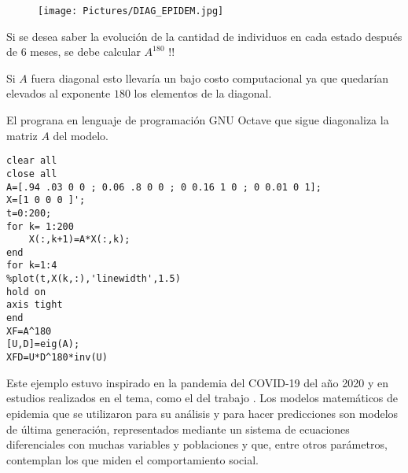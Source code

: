 \bigskip



\begin{figure}[ht]
	\centering
			\texttt{[image: Pictures/DIAG\_EPIDEM.jpg]}
 \end{figure}

\bigskip

Si se desea saber la evolución de la cantidad de individuos en cada estado después de 6 meses, se debe calcular $A^{180}$ !! 

Si $A$ fuera diagonal esto llevaría un  bajo costo computacional ya que quedarían elevados al exponente $180$  los elementos de la diagonal.



\bigskip

El prograna en lenguaje de programación GNU Octave que sigue diagonaliza la matriz $A$ del modelo. 


\bigskip



\begin{lstlisting}[frame=single]
% MODELO SIRD (SUSCEPTIBLES, INFECTADOS, RECUPERADOS, FALLECIDOS)
clear all
close all
A=[.94 .03 0 0 ; 0.06 .8 0 0 ; 0 0.16 1 0 ; 0 0.01 0 1];
X=[1 0 0 0 ]';
t=0:200;
for k= 1:200
    X(:,k+1)=A*X(:,k);
end
for k=1:4
%plot(t,X(k,:),'linewidth',1.5)
hold on
axis tight
end
XF=A^180
[U,D]=eig(A);
XFD=U*D^180*inv(U)
\end{lstlisting}

\bigskip


\begin{remark}
Este ejemplo estuvo inspirado en la pandemia del COVID-19 del año 2020 y en estudios realizados en el tema, como el del trabajo \cite{covid}.  Los modelos matemáticos de epidemia que se utilizaron para su análisis  y para hacer predicciones  son modelos  de última generación,  representados mediante un sistema de ecuaciones diferenciales  con muchas variables y  poblaciones y que, entre otros  parámetros,  contemplan los que miden el comportamiento social. 
\end{remark}




